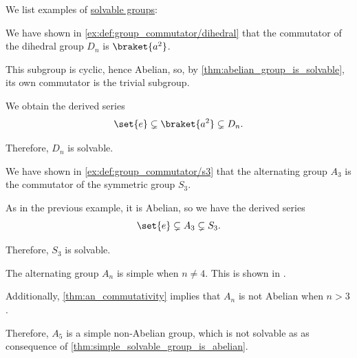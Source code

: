 \begin{example}\label{ex:def:solvable_group}
  We list examples of \hyperref[def:solvable_group]{solvable groups}:
  \begin{thmenum}
     We have shown in \cref{ex:def:group_commutator/dihedral} that the commutator of the dihedral group \( D_n \) is \( \braket{ a^2 } \).

    This subgroup is cyclic, hence Abelian, so, by \cref{thm:abelian_group_is_solvable}, its own commutator is the trivial subgroup.

    We obtain the derived series
    \begin{equation*}
      \set{ e } \subsetneq \braket{ a^2 } \subsetneq D_n.
    \end{equation*}

    Therefore, \( D_n \) is solvable.

     We have shown in \cref{ex:def:group_commutator/s3} that the alternating group \( A_3 \) is the commutator of the symmetric group \( S_3 \).

    As in the previous example, it is Abelian, so we have the derived series
    \begin{equation*}
      \set{ e } \subsetneq A_3 \subsetneq S_3.
    \end{equation*}

    Therefore, \( S_3 \) is solvable.

     The alternating group \( A_n \) is simple when \( n \neq 4 \). This is shown in \cite[\S 9]{Курош1967ТеорияГрупп}.

    Additionally, \cref{thm:an_commutativity} implies that \( A_n \) is not Abelian when \( n > 3 \).

    Therefore, \( A_5 \) is a simple non-Abelian group, which is not solvable as as consequence of \cref{thm:simple_solvable_group_is_abelian}.
  \end{thmenum}
\end{example}
